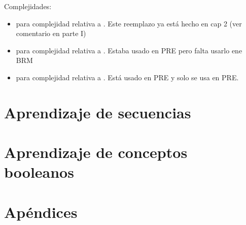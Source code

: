\documentclass[a4paper,12pt,oneside]{book}
\begin{document}
Complejidades:

\begin{itemize}
\item \mdlbin para complejidad relativa a \grambin . Este reemplazo ya está hecho en cap 2 (ver comentario en parte I)

\item \mdl{\grambool} para complejidad relativa a \grambool. Estaba usado en PRE pero falta usarlo ene BRM

\item \mdl{\gramboolxor} para complejidad relativa a \gramboolxor. Está usado en PRE y solo se usa en PRE.
\end{itemize}


    
\restoregeometry 

    
    
    
    
\tableofcontents


\setlength{\parskip}{0.5em}

    
    \part{Aprendizaje de secuencias}
        
        
        
    \part{Aprendizaje de conceptos booleanos}
        
        
        
         
    \part{Apéndices}
        \appendix
        
        
        
    
    
    
\end{document}
